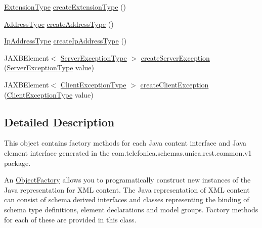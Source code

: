 \begin{DoxyCompactItemize}
\item 
\hyperlink{classcom_1_1telefonica_1_1schemas_1_1unica_1_1rest_1_1common_1_1v1_1_1ExtensionType}{ExtensionType} \hyperlink{classcom_1_1telefonica_1_1schemas_1_1unica_1_1rest_1_1common_1_1v1_1_1ObjectFactory_aa533ec191ed501ee499586c38f3de4f9}{createExtensionType} ()
\item 
\hyperlink{classcom_1_1telefonica_1_1schemas_1_1unica_1_1rest_1_1common_1_1v1_1_1AddressType}{AddressType} \hyperlink{classcom_1_1telefonica_1_1schemas_1_1unica_1_1rest_1_1common_1_1v1_1_1ObjectFactory_a463d0aafba13b2bddc95b2889e3d0298}{createAddressType} ()
\item 
\hyperlink{classcom_1_1telefonica_1_1schemas_1_1unica_1_1rest_1_1common_1_1v1_1_1IpAddressType}{IpAddressType} \hyperlink{classcom_1_1telefonica_1_1schemas_1_1unica_1_1rest_1_1common_1_1v1_1_1ObjectFactory_a1bdf681d020ae7b2a417e4cab11a76a7}{createIpAddressType} ()
\item 
JAXBElement$<$ \hyperlink{classcom_1_1telefonica_1_1schemas_1_1unica_1_1rest_1_1common_1_1v1_1_1ServerExceptionType}{ServerExceptionType} $>$ \hyperlink{classcom_1_1telefonica_1_1schemas_1_1unica_1_1rest_1_1common_1_1v1_1_1ObjectFactory_a1919266ea1cb16464a4c6611234b7a40}{createServerException} (\hyperlink{classcom_1_1telefonica_1_1schemas_1_1unica_1_1rest_1_1common_1_1v1_1_1ServerExceptionType}{ServerExceptionType} value)
\item 
JAXBElement$<$ \hyperlink{classcom_1_1telefonica_1_1schemas_1_1unica_1_1rest_1_1common_1_1v1_1_1ClientExceptionType}{ClientExceptionType} $>$ \hyperlink{classcom_1_1telefonica_1_1schemas_1_1unica_1_1rest_1_1common_1_1v1_1_1ObjectFactory_a3a4d629406d032f56db09281dd676d0a}{createClientException} (\hyperlink{classcom_1_1telefonica_1_1schemas_1_1unica_1_1rest_1_1common_1_1v1_1_1ClientExceptionType}{ClientExceptionType} value)
\end{DoxyCompactItemize}


\subsection{Detailed Description}
This object contains factory methods for each Java content interface and Java element interface generated in the com.telefonica.schemas.unica.rest.common.v1 package. 

An \hyperlink{classcom_1_1telefonica_1_1schemas_1_1unica_1_1rest_1_1common_1_1v1_1_1ObjectFactory}{ObjectFactory} allows you to programatically construct new instances of the Java representation for XML content. The Java representation of XML content can consist of schema derived interfaces and classes representing the binding of schema type definitions, element declarations and model groups. Factory methods for each of these are provided in this class. 


